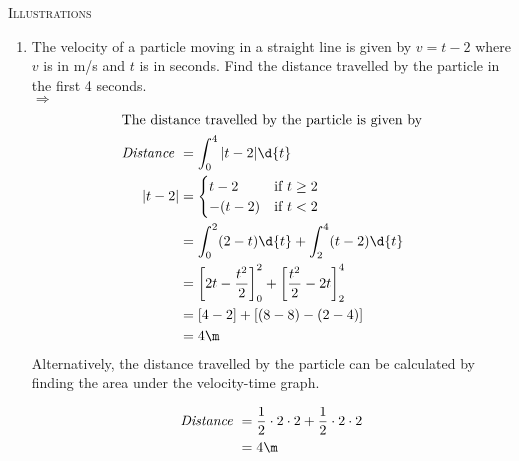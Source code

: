 \documentclass{article}
\newenvironment{solution}{\color{red!85!black}}{}
\begin{document}
\begin{center}
    \textsc{Illustrations}
\end{center}
\begin{enumerate}
    \item The velocity of a particle moving in a straight line is given by $v=t-2$ where $v$ is in m/s and $t$ is in seconds. Find the distance travelled by the particle in the first 4 seconds.\\
    \begin{solution}
        $\Rightarrow$
        \begin{align*}
            \intertext{The distance travelled by the particle is given by}
            \textit{Distance } &= \int_{0}^{4} |t-2|\d{t}\\
            |t-2| &= \begin{cases}
                t-2 & \text{if } t \geq 2\\
                -(t-2) & \text{if } t < 2
            \end{cases}\\
            &= \int_{0}^{2} (2-t)\d{t} + \int_{2}^{4} (t-2)\d{t}\\
            &= \left[2t-\frac{t^2}{2}\right]_{0}^{2} + \left[\frac{t^2}{2}-2t\right]_{2}^{4}\\
            &= \left[4-2\right] + \left[(8-8)-(2-4)\right]\\
            &= 4\m
        \end{align*}
        Alternatively, the distance travelled by the particle can be calculated by finding the area under the velocity-time graph.
        \begin{center}
        \end{center}
        \begin{align*}
            \textit{Distance } &= \dfrac{1}{2}\cdot 2 \cdot 2 + \dfrac{1}{2}\cdot 2 \cdot 2\\
            &= 4\m
        \end{align*}
        \begin{center}
        \end{center}
    \end{solution}


\end{enumerate}
\end{document}
